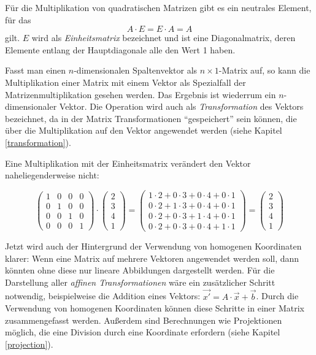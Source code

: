 Für die Multiplikation von quadratischen Matrizen gibt es ein neutrales Element, für das
\begin{equation}
 A \cdot E = E \cdot A = A
\end{equation}
gilt. $E$ wird als \emph{Einheitsmatrix} bezeichnet und ist eine Diagonalmatrix, deren Elemente entlang der Hauptdiagonale alle den Wert 1 haben.

Fasst man einen $n$-dimensionalen Spaltenvektor als $n \times 1$-Matrix auf, so kann die Multiplikation einer Matrix mit einem Vektor als Spezialfall der Matrizenmultiplikation gesehen werden. Das Ergebnis ist wiederrum ein $n$-dimensionaler Vektor. Die Operation wird auch als \emph{Transformation} des Vektors bezeichnet, da in der Matrix Transformationen \enquote{gespeichert} sein können, die über die Multiplikation auf den Vektor angewendet werden (siehe Kapitel \ref{transformation}).

Eine Multiplikation mit der Einheitsmatrix verändert den Vektor naheliegenderweise nicht:

\begin{equation}
 \begin{pmatrix}
  1 & 0 & 0 & 0 \\
  0 & 1 & 0 & 0 \\
  0 & 0 & 1 & 0 \\
  0 & 0 & 0 & 1
 \end{pmatrix}
 \cdot
 \begin{pmatrix}
  2 \\
  3 \\
  4 \\
  1
 \end{pmatrix}
 =
 \begin{pmatrix}
  1 \cdot 2 + 0 \cdot 3 + 0 \cdot 4 + 0 \cdot 1 \\
  0 \cdot 2 + 1 \cdot 3 + 0 \cdot 4 + 0 \cdot 1 \\
  0 \cdot 2 + 0 \cdot 3 + 1 \cdot 4 + 0 \cdot 1 \\
  0 \cdot 2 + 0 \cdot 3 + 0 \cdot 4 + 1 \cdot 1
 \end{pmatrix}
 =
 \begin{pmatrix}
  2 \\
  3 \\
  4 \\
  1
 \end{pmatrix}
\end{equation}

Jetzt wird auch der Hintergrund der Verwendung von homogenen Koordinaten klarer: Wenn eine Matrix auf mehrere Vektoren angewendet werden soll, dann könnten ohne diese nur lineare Abbildungen dargestellt werden. Für die Darstellung aller \emph{affinen Transformationen} wäre ein zusätzlicher Schritt notwendig, beispielweise die Addition eines Vektors: $\vec{x'} = A \cdot \vec{x} + \vec{b}$. Durch die Verwendung von homogenen Koordinaten können diese Schritte in einer Matrix zusammengefasst werden. Außerdem sind Berechnungen wie Projektionen möglich, die eine Division durch eine Koordinate erfordern (siehe Kapitel \ref{projection}).


